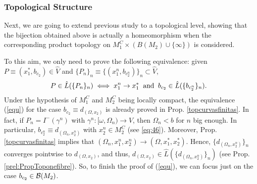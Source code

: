 \subsubsection{Topological Structure}

 Next, we are going to extend previous study to a topological level, showing that the bijection obtained above is actually a homeomorphism when the corresponding product topology on $M_1^C\times (B(M_2)\cup \{\infty\})$ is considered.

 To this aim, we only need to prove the following equivalence:
given $P\equiv (x_1^*,b_{c_2})\in \hat{V}$ and $\{P_n\}_n\equiv \{(x_1^n,b_{c_2^n})\}_n\subset \hat{V}$,
\begin{equation}\label{equ}
P\in \hat{L}(\{P_n\}_n)\iff  x_1^n\rightarrow x^*_1\;\;\hbox{and}\;\; b_{c_2}\in \hat{L}(\{b_{c_2^n}\}_n).
  \end{equation}
  Under the hypothesis of $M_1^C$ and $M_2^C$ being locally compact, the equivalence (\ref{equ}) for the case $b_{c_2}\equiv d_{(\Omega,x_2)}$ is already proved in Prop. \ref{topcurvasfinitas}. In fact, if $P_n=I^-(\gamma^n)$ with $\gamma^n:[\omega,\Omega_n)\rightarrow V$, then $\Omega_n<b$ for $n$ big enough. In particular, $b_{c_2^n}\equiv d_{(\Omega_n,x^n_2)}$ with $x_2^n\in M_2^C$ (see \eqref{eq:46}). Moreover, Prop. \ref{topcurvasfinitas} implies that $(\Omega_n,x_1^n,x_2^n)\rightarrow (\Omega,x^*_1,x^*_2)$. Hence, $\{d_{(\Omega_n,x_2^n)}\}_n$ converges pointwise to $d_{(\Omega,x_2)}$, and thus, $d_{(\Omega,x_2)}\in \hat{L}(\{d_{(\Omega_n,x_2^n)}\}_n)$ (see Prop. \ref{prel:PropToponefibre}). So, to finish the proof of (\ref{equ}), we can focus just on the case $b_{c_2}\in {\cal B}(M_2)$.


